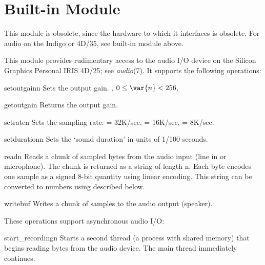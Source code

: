 \section{Built-in Module }

 This module is obsolete, since the hardware to which it
interfaces is obsolete.  For audio on the Indigo or 4D/35, see
built-in module  above.

This module provides rudimentary access to the audio I/O device
 on the Silicon Graphics Personal IRIS 4D/25;
see {\it audio}(7). It supports the following operations:

\renewcommand{\indexsubitem}{(in module audio)}
\begin{funcdesc}{setoutgain}{n}
Sets the output gain.
\iftexi
{}.
\else
$0 \leq \var{n} < 256$.
\fi
\end{funcdesc}

\begin{funcdesc}{getoutgain}{}
Returns the output gain.
\end{funcdesc}

\begin{funcdesc}{setrate}{n}
Sets the sampling rate:  = 32K/sec,  = 16K/sec,
 = 8K/sec.
\end{funcdesc}

\begin{funcdesc}{setduration}{n}
Sets the `sound duration' in units of 1/100 seconds.
\end{funcdesc}

\begin{funcdesc}{read}{n}
Reads a chunk of
sampled bytes from the audio input (line in or microphone).
The chunk is returned as a string of length n.
Each byte encodes one sample as a signed 8-bit quantity using linear
encoding.
This string can be converted to numbers using  described
below.
\end{funcdesc}

\begin{funcdesc}{write}{buf}
Writes a chunk of samples to the audio output (speaker).
\end{funcdesc}

These operations support asynchronous audio I/O:

\renewcommand{\indexsubitem}{(in module audio)}
\begin{funcdesc}{start_recording}{n}
Starts a second thread (a process with shared memory) that begins reading
bytes from the audio device.
The main thread immediately continues.
\end{funcdesc}

